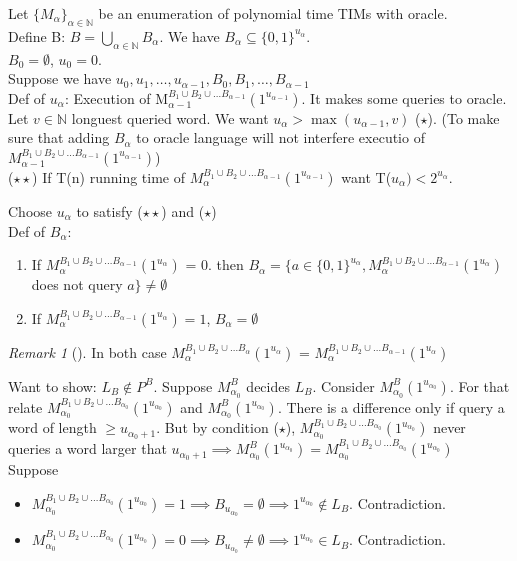 \documentclass{article}
\theoremstyle{definition}
\theoremstyle{remark}
\newtheorem*{remark}{Remark}
\newcommand{\Rem}[3]{\begin{remark}[#1]\label{#2}#3\end{remark}}
\newcommand{\N}{\mathbb{N}}
\begin{document}
{\begin{itemize}
	Let $\{M_\alpha\}_{\alpha\in\N}$ be an enumeration of polynomial time TIMs with oracle.\\
	Define B: $B = \bigcup_{\alpha\in\N} B_\alpha$.
	We have $B_\alpha \subseteq \{0,1\}^{u_\alpha}$.\\
	$B_0 = \emptyset$, $u_0 = 0$.\\
	Suppose we have $u_0,u_1,\dots,u_{\alpha-1},B_0,B_1,\dots,B_{\alpha-1}$\\
	Def of $u_\alpha$: Execution of M$_{\alpha-1}^{B_1\cup B_2 \cup \dots B_{\alpha - 1}}(1^{u_{\alpha-1}})$. It makes some queries to oracle. Let $v\in\N$ longuest queried word. We want $u_\alpha > \max(u_{\alpha-1},v)$ ($\star$). (To make sure that adding $B_\alpha$ to oracle language will not interfere executio of $M_{\alpha-1}^{B_1\cup B_2 \cup \dots B_{\alpha - 1}}(1^{u_{\alpha-1}})$)\\
	($\star\star$) If T(n) running time of $M_{\alpha}^{B_1\cup B_2 \cup \dots B_{\alpha - 1}}(1^{u_{\alpha-1}})$ want T($u_\alpha) < 2^{u_\alpha}$.
	
	Choose $u_\alpha$ to satisfy ($\star\star$) and ($\star$)\\
	
	Def of $B_\alpha$:
	\begin{enumerate}
		\item If $M_{\alpha}^{B_1\cup B_2 \cup \dots B_{\alpha - 1}}(1^{u_{\alpha}})$ = 0. then $B_\alpha = \{a\in\{0,1\}^{u_\alpha}, M_{\alpha}^{B_1\cup B_2 \cup \dots B_{\alpha - 1}}(1^{u_{\alpha}}) $ does not query $a\} \neq \emptyset$
		\item If $M_{\alpha}^{B_1\cup B_2 \cup \dots B_{\alpha - 1}}(1^{u_{\alpha}}) = 1$, $B_\alpha = \emptyset$
	\end{enumerate}
	
\Rem{}{}{In both case $M_{\alpha}^{B_1\cup B_2 \cup \dots B_{\alpha}}(1^{u_{\alpha}})$ = $M_{\alpha}^{B_1\cup B_2 \cup \dots B_{\alpha - 1}}(1^{u_{\alpha}})$}

Want to show: $L_B\not\in P^B$. Suppose $M^B_{\alpha_0}$ decides $L_B$. Consider $M^B_{\alpha_0}(1^{u_{\alpha_0}})$. For that relate $M_{\alpha_0}^{B_1\cup B_2 \cup \dots B_{\alpha_0}}(1^{u_{\alpha_0}})$ and $M_{\alpha_0}^{B}(1^{u_{\alpha_0}})$. There is a difference only if query a word of length $\geq u_{\alpha_0 + 1}$. But by condition ($\star$), $M_{\alpha_0}^{B_1\cup B_2 \cup \dots B_{\alpha _0}}(1^{u_{\alpha_0}})$ never queries a word larger that $u_{\alpha_0 + 1} \implies M_{\alpha_0}^{B}(1^{u_{\alpha_0}}) = M_{\alpha_0}^{B_1\cup B_2 \cup \dots B_{\alpha_0}}(1^{u_{\alpha_0}})$\\

Suppose \begin{itemize}
	\item $M_{\alpha_0}^{B_1\cup B_2 \cup \dots B_{\alpha_0}}(1^{u_{\alpha_0}}) = 1 \implies B_{u_{\alpha_0}} = \emptyset \implies 1^{u_{\alpha_0}}\notin L_B$. Contradiction.
		\item $M_{\alpha_0}^{B_1\cup B_2 \cup \dots B_{\alpha_0}}(1^{u_{\alpha_0}}) = 0 \implies B_{u_{\alpha_0}} \neq \emptyset \implies 1^{u_{\alpha_0}}\in L_B$. Contradiction.
\end{itemize}
\end{itemize}
}
\end{document}
